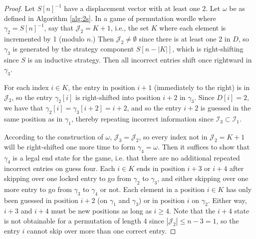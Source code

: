 \documentclass[article]{amsart}
\theoremstyle{plain}
\begin{document}
\begin{proof}
    Let $S[n]^{-1}$ have a displacement vector with at least one 2. Let $\omega$ be as defined in Algorithm \ref{alg:2s}. In a game of permutation wordle where $\gamma_2 = S[n]^{-1}$, say that $\mathcal{J}_2 = K+1$, i.e., the set $K$ where each element is incremented by 1 (modulo $n$.) Then $\mathcal{J}_2 \neq \emptyset$ since there is at least one 2 in $D$, so $\gamma_3$ is generated by the strategy component $S[n - |K|]$, which is right-shifting since $S$ is an inductive strategy. Then all incorrect entries shift once rightward in $\gamma_3$. 

    For each index $i \in K$, the entry in position $i+1$ (immediately to the right) is in $\mathcal{J}_2$, so the entry $\gamma_2[i]$ is right-shifted into position $i+2$ in $\gamma_3$. Since $D[i] = 2$, we have that $\gamma_2[i] = \gamma_3[i+2] = i+2$, and so the entry $i+2$ is guessed in the same position as in $\gamma_1$, thereby repeating incorrect information since $\mathcal{I}_3 \subset \mathcal{I}_1$. 

    According to the construction of $\omega$, $\mathcal{J}_3 = \mathcal{J}_2$, so every index not in $\mathcal{J}_2 = K+1$ will be right-shifted one more time to form $\gamma_4 = \omega$. Then it suffices to show that $\gamma_4$ is a legal end state for the game, i.e. that there are no additional repeated incorrect entries on guess four. Each $i \in K$ ends in position $i+3$ or $i+4$ after skipping over one locked entry to go from $\gamma_2$ to $\gamma_3$, and either skipping over one more entry to go from $\gamma_3$ to $\gamma_4$ or not. Each element in a position $i \in K$ has only been guessed in position $i+2$ (on $\gamma_1$ and $\gamma_3$) or in position $i$ on $\gamma_2$. Either way, $i+3$ and $i+4$ must be new positions as long as $i \geq 4$. Note that the $i+4$ state is not obtainable for a permutation of length 4 since $|\mathcal{J}_2| \leq n-3 = 1$, so the entry $i$ cannot skip over more than one correct entry.


\end{proof}
\end{document}
